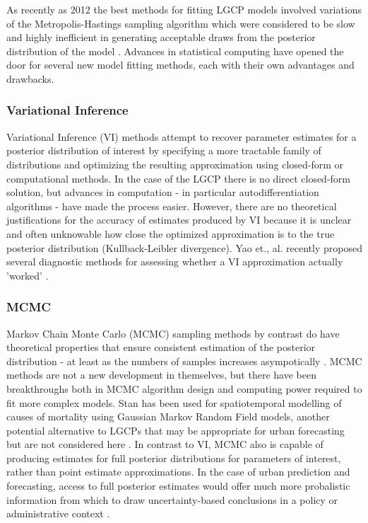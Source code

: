  As recently as 2012 the best methods for fitting LGCP models involved variations of the Metropolis-Hastings sampling algorithm which were considered to be slow and highly inefficient in generating acceptable draws from the posterior distribution of the model \cite{murray_2012}. Advances in statistical computing have opened the door for several new model fitting methods, each with their own advantages and drawbacks.

\subsubsection{Variational Inference}

Variational Inference (VI) methods attempt to recover parameter estimates for a posterior distribution of interest by specifying a more tractable family of distributions and optimizing the resulting approximation using closed-form or computational methods. In the case of the LGCP there is no direct closed-form solution, but advances in computation - in particular autodifferentiation algorithms - have made the process easier. However, there are no theoretical justifications for the accuracy of estimates produced by VI because it is unclear and often unknowable how close the optimized approximation is to the true posterior distribution (Kullback-Leibler divergence). Yao et., al. recently proposed several diagnostic methods for assessing whether a VI approximation actually 'worked' \cite{yao_2018}.

\subsubsection{MCMC}

Markov Chain Monte Carlo (MCMC) sampling methods by contrast do have theoretical properties that ensure consistent estimation of the posterior distribution - at least  as the numbers of samples increases asympotically \cite{teng_2017}. MCMC methods are not a new development in themselves, but there have been breakthroughs both in MCMC algorithm design and computing power required to fit more complex models. Stan has been used for spatiotemporal modelling of causes of mortality using Gaussian Markov Random Field models, another potential alternative to LGCPs that may be appropriate for urban forecasting but are not considered here \cite{foreman_2017}. In contrast to VI, MCMC also is capable of producing estimates for full posterior distributions for parameters of interest, rather than point estimate approximations. In the case of urban prediction and forecasting, access to full posterior estimates would offer much more probalistic information from which to draw uncertainty-based conclusions in a policy or administrative context .

